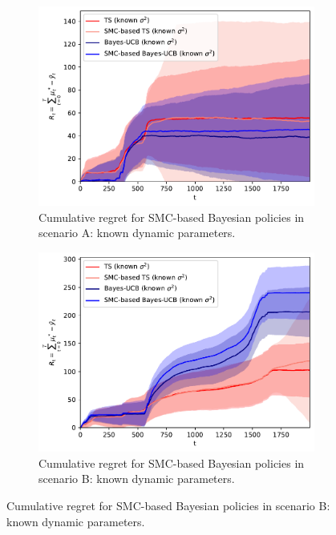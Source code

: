 \begin{figure}[!h]
	\begin{subfigure}[b]{0.47\textwidth}
		\includegraphics[width=\textwidth]{./fods_figs/dynamic/linearGaussian/a_M2000_cumulative_regret_dknown_knownsigma}
		\caption{Cumulative regret for SMC-based Bayesian policies in scenario A: known dynamic parameters.}
		\label{fig:dynamic_bandits_linearGaussian_a_cstatic_dknown_knownsigma}
	\end{subfigure}\qquad
	\begin{subfigure}[b]{0.47\textwidth}
		\includegraphics[width=\textwidth]{./fods_figs/dynamic/linearGaussian/b_M2000_cumulative_regret_dknown_knownsigma}
		\caption{Cumulative regret for SMC-based Bayesian policies in scenario B: known dynamic parameters.}
		\label{fig:dynamic_bandits_linearGaussian_b_cstatic_dknown_knownsigma}
	\end{subfigure}
	

\end{figure}
